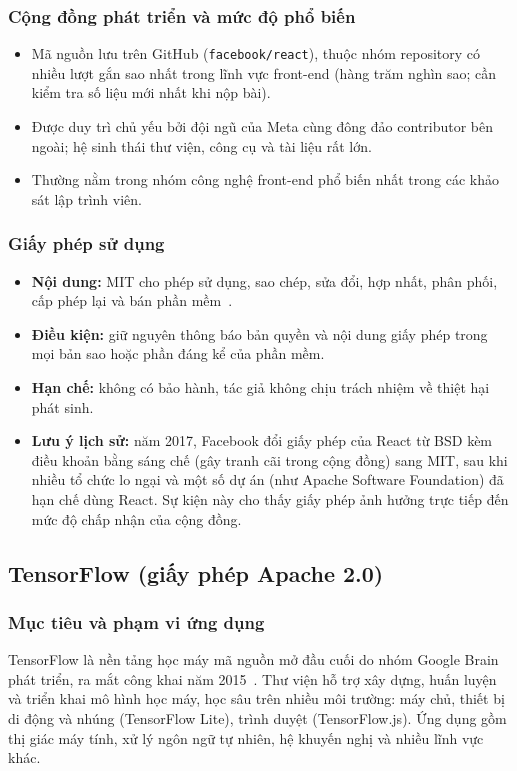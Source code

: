 \documentclass[12pt,a4paper]{article}
\newcommand{\fn}[1]{\texttt{#1}}
\begin{document}
\subsubsection*{Cộng đồng phát triển và mức độ phổ biến}
\begin{itemize}
  \item Mã nguồn lưu trên GitHub (\fn{facebook/react}), thuộc nhóm repository có nhiều lượt gắn sao nhất trong lĩnh vực front-end (hàng trăm nghìn sao; cần kiểm tra số liệu mới nhất khi nộp bài).
  \item Được duy trì chủ yếu bởi đội ngũ của Meta cùng đông đảo contributor bên ngoài; hệ sinh thái thư viện, công cụ và tài liệu rất lớn.
  \item Thường nằm trong nhóm công nghệ front-end phổ biến nhất trong các khảo sát lập trình viên.
\end{itemize}
\subsubsection*{Giấy phép sử dụng}
\begin{itemize}
  \item \textbf{Nội dung:} MIT cho phép sử dụng, sao chép, sửa đổi, hợp nhất, phân phối, cấp phép lại và bán phần mềm~\cite{mit}.
  \item \textbf{Điều kiện:} giữ nguyên thông báo bản quyền và nội dung giấy phép trong mọi bản sao hoặc phần đáng kể của phần mềm.
  \item \textbf{Hạn chế:} không có bảo hành, tác giả không chịu trách nhiệm về thiệt hại phát sinh.
  \item \textbf{Lưu ý lịch sử:} năm 2017, Facebook đổi giấy phép của React từ BSD kèm điều khoản bằng sáng chế (gây tranh cãi trong cộng đồng) sang MIT, sau khi nhiều tổ chức lo ngại và một số dự án (như Apache Software Foundation) đã hạn chế dùng React. Sự kiện này cho thấy giấy phép ảnh hưởng trực tiếp đến mức độ chấp nhận của cộng đồng.
\end{itemize}

\subsection{TensorFlow (giấy phép Apache 2.0)}\label{sec:tf}
\subsubsection*{Mục tiêu và phạm vi ứng dụng}
TensorFlow là nền tảng học máy mã nguồn mở đầu cuối do nhóm Google Brain phát triển, ra mắt công khai năm 2015~\cite{tf}. Thư viện hỗ trợ xây dựng, huấn luyện và triển khai mô hình học máy, học sâu trên nhiều môi trường: máy chủ, thiết bị di động và nhúng (TensorFlow Lite), trình duyệt (TensorFlow.js). Ứng dụng gồm thị giác máy tính, xử lý ngôn ngữ tự nhiên, hệ khuyến nghị và nhiều lĩnh vực khác.
\end{document}
